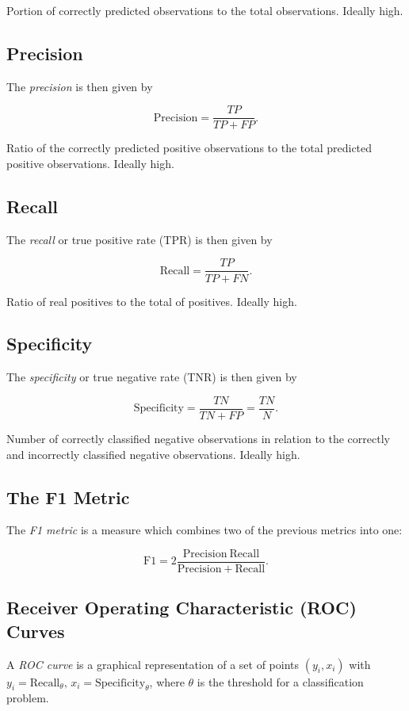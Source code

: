 Portion of correctly predicted observations to the total observations.
Ideally high.

\subsection{Precision}

The \emph{precision} is then given by

\[
	\mathrm{Precision} = \frac{TP}{TP + FP}.
\]

Ratio of the correctly predicted positive observations to the total predicted positive observations.
Ideally high.

\subsection{Recall}

The \emph{recall} or true positive rate (TPR) is then given by

\[
	\mathrm{Recall} = \frac{TP}{TP + FN}.
\]

Ratio of real positives to the total of positives. Ideally high.

\subsection{Specificity}

The \emph{specificity} or true negative rate (TNR) is then given by

\[
	\mathrm{Specificity} = \frac{TN}{TN + FP} = \frac{TN}{N}.
\]

Number of correctly classified negative observations in relation to the correctly and incorrectly classified negative observations.
Ideally high.

\subsection{The F1 Metric}

The \emph{F1 metric} is a measure which combines two of the previous metrics into one: 

\[
	\mathrm{F1} = 2 \frac{\mathrm{Precision} \ \mathrm{Recall}}{\mathrm{Precision} + \mathrm{Recall}}.
\]

\subsection{Receiver Operating Characteristic (ROC) Curves}

A \emph{ROC curve} is a graphical representation of a set of points \((y_i, x_i)\) with 
\(y_i = \mathrm{Recall}_\theta, \, x_i = \mathrm{Specificity}_\theta\), where \(\theta\) is the threshold for 
a classification problem.

